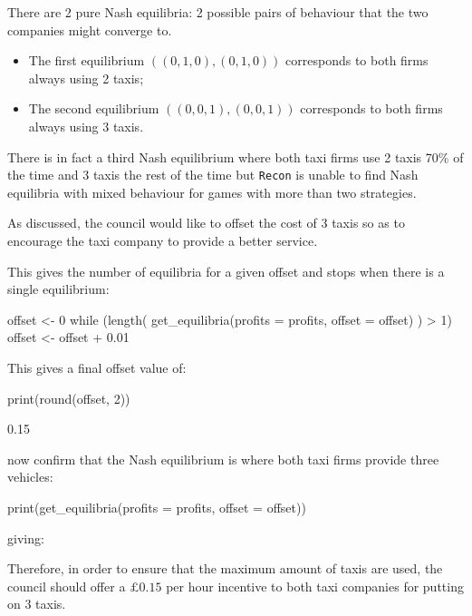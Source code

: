 There are 2 pure Nash equilibria: 2 possible pairs of behaviour that the two
companies might converge to.

\begin{itemize}
    \item The first equilibrium \(((0, 1, 0), (0, 1, 0))\) corresponds to both
          firms always using 2 taxis;
    \item The second equilibrium \(((0, 0, 1), (0, 0, 1))\) corresponds to both
          firms always using 3 taxis.
\end{itemize}

There is in fact a third Nash equilibrium where both taxi firms use 2 taxis 70\%
of the time and 3 taxis the rest of the time but \texttt{Recon} is unable
to find Nash equilibria with mixed behaviour for games with more than two
strategies.

As discussed, the council would like to offset the cost of 3
taxis so as to encourage the taxi company to provide a better service.

This gives the number of equilibria for a given offset and stops when there is a
single equilibrium:

\begin{Rin}
offset <- 0
while (length(
            get_equilibria(profits = profits, offset = offset)
            ) > 1){
    offset <- offset + 0.01
}
\end{Rin}

This gives a final offset value of:

\begin{Rin}
print(round(offset, 2))
\end{Rin}

\begin{Rout}
[1] 0.15
\end{Rout}

now confirm that the Nash equilibrium is where both taxi firms provide
three vehicles:

\begin{Rin}
print(get_equilibria(profits = profits, offset = offset))
\end{Rin}

giving:


Therefore, in order to ensure that the maximum amount of taxis are used, the
council should offer a \(\pounds 0.15\) per hour incentive to both taxi
companies for putting on 3 taxis.


